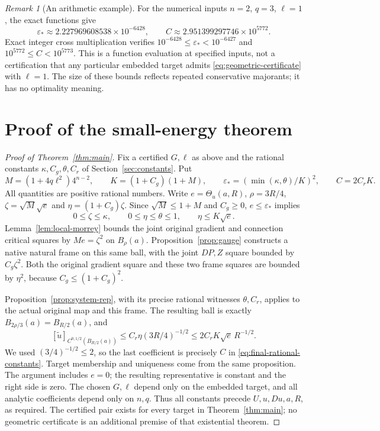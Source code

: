 \documentclass[11pt,a4paper]{article}
\numberwithin{equation}{section}
\theoremstyle{definition}
\theoremstyle{remark}
\newtheorem{remark}[theorem]{Remark}
\newcommand{\Th}{\Theta}
\begin{document}
\begin{remark}[An arithmetic example]\label{rem:example}
For the numerical inputs $n=2$, $q=3$, $\ell=1$, the exact functions give
\[
 \varepsilon_*\approx2.227969608538\times10^{-6428},\qquad
 C\approx2.951399297746\times10^{5772}.
\]
Exact integer cross multiplication verifies
$10^{-6428}\leq\varepsilon_*<10^{-6427}$ and
$10^{5772}\leq C<10^{5773}$. This is a function evaluation at specified
inputs, not a certification that any particular embedded target admits
\eqref{eq:geometric-certificate} with $\ell=1$. The size of these bounds
reflects repeated conservative majorants; it has no optimality meaning.
\end{remark}

\section{Proof of the small-energy theorem}\label{sec:assembly}
\begin{proof}[Proof of Theorem~\ref{thm:main}]
Fix a certified $G,\ell$ as above and the rational constants
$\kappa,C_g,\theta,C_r$ of Section~\ref{sec:constants}. Put
\begin{equation}\label{eq:final-rational-constants}
 M=(1+4q\ell^2)4^{n-2},\qquad K=(1+C_g)(1+M),\qquad
 \varepsilon_*=(\min(\kappa,\theta)/K)^2,\qquad C=2C_rK.
\end{equation}
All quantities are positive rational numbers. Write $e=\Th_u(a,R)$,
$\rho=3R/4$, $\zeta=\sqrt M\sqrt e$ and
$\eta=(1+C_g)\zeta$. Since $\sqrt M\leq1+M$ and $C_g\geq0$,
$e\leq\varepsilon_*$ implies
\[
 0\leq\zeta\leq\kappa,\qquad
 0\leq\eta\leq\theta\leq1,\qquad \eta\leq K\sqrt e.
\]
Lemma~\ref{lem:local-morrey} bounds the joint original gradient and
connection critical squares by $Me=\zeta^2$ on $B_\rho(a)$.
Proposition~\ref{prop:gauge} constructs a native natural frame on this
same ball, with the joint $DP,Z$ square bounded by $C_g\zeta^2$.
Both the original gradient square and these two frame squares are
bounded by $\eta^2$, because $C_g\leq(1+C_g)^2$.

Proposition~\ref{prop:system-rep}, with its precise rational witnesses
$\theta,C_r$, applies to the actual original map and this frame.
The resulting ball is exactly $B_{2\rho/3}(a)=B_{R/2}(a)$, and
\[
 [\widetilde u]_{C^{0,1/2}(B_{R/2}(a))}
 \leq C_r\eta(3R/4)^{-1/2}
 \leq2C_rK\sqrt e\,R^{-1/2}.
\]
We used $(3/4)^{-1/2}\leq2$, so the last coefficient is precisely
$C$ in \eqref{eq:final-rational-constants}. Target membership and
uniqueness come from the same proposition. The argument includes
$e=0$; the resulting representative is constant and the right side is
zero. The chosen $G,\ell$ depend only on the embedded target, and all
analytic coefficients depend only on $n,q$. Thus all constants precede
$U,u,Du,a,R$, as required. The certified pair exists for every target
in Theorem~\ref{thm:main}; no geometric certificate is an additional
premise of that existential theorem.
\end{proof}
\end{document}
